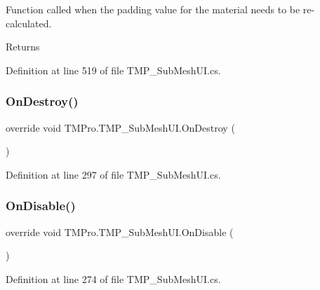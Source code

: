 Function called when the padding value for the material needs to be re-\/calculated. 

\begin{DoxyReturn}{Returns}

\end{DoxyReturn}


Definition at line 519 of file T\+M\+P\+\_\+\+Sub\+Mesh\+U\+I.\+cs.

\mbox{\label{class_t_m_pro_1_1_t_m_p___sub_mesh_u_i_aebef8466a825a92f2d403efd056f20a6}} 
\subsubsection{\texorpdfstring{OnDestroy()}{OnDestroy()}}
{\footnotesize\ttfamily override void T\+M\+Pro.\+T\+M\+P\+\_\+\+Sub\+Mesh\+U\+I.\+On\+Destroy (\begin{DoxyParamCaption}{ }\end{DoxyParamCaption})\hspace{0.3cm}{\ttfamily [protected]}}



Definition at line 297 of file T\+M\+P\+\_\+\+Sub\+Mesh\+U\+I.\+cs.

\mbox{\label{class_t_m_pro_1_1_t_m_p___sub_mesh_u_i_a06ee252d51e45e951fdef895135559b4}} 
\subsubsection{\texorpdfstring{OnDisable()}{OnDisable()}}
{\footnotesize\ttfamily override void T\+M\+Pro.\+T\+M\+P\+\_\+\+Sub\+Mesh\+U\+I.\+On\+Disable (\begin{DoxyParamCaption}{ }\end{DoxyParamCaption})\hspace{0.3cm}{\ttfamily [protected]}}



Definition at line 274 of file T\+M\+P\+\_\+\+Sub\+Mesh\+U\+I.\+cs.

\mbox{\label{class_t_m_pro_1_1_t_m_p___sub_mesh_u_i_a685c041796705a824e2432c1cf075db6}} 
